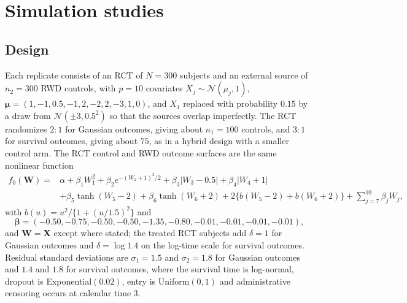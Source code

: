 \documentclass[11pt]{article}
\newcommand{\Normal}{\mathcal{N}}
\theoremstyle{definition}
\theoremstyle{plain}
\begin{document}

\section{Simulation studies}
\label{sec:sim}

\subsection{Design}
\label{sec:sim_design}

Each replicate consists of an RCT of $N=300$ subjects and an external source of $n_2=300$ RWD controls, with $p=10$ covariates $X_j\sim\Normal(\mu_j,1)$, $\bm\mu=(1,-1,0.5,-1,2,-2,2,-3,1,0)$, and $X_1$ replaced with probability $0.15$ by a draw from $\Normal(\pm3,0.5^2)$ so that the sources overlap imperfectly. The RCT randomizes $2{:}1$ for Gaussian outcomes, giving about $n_1=100$ controls, and $3{:}1$ for survival outcomes, giving about $75$, as in a hybrid design with a smaller control arm. The RCT control and RWD outcome surfaces are the same nonlinear function
\begin{equation}
\begin{aligned}
f_0(\bm W)={}&\alpha+\beta_1W_1^2+\beta_2e^{-(W_2+1)^2/2}+\beta_3|W_3-0.5|+\beta_4|W_4+1|\\
&+\beta_5\tanh(W_5-2)+\beta_6\tanh(W_6+2)+2\{b(W_5-2)+b(W_6+2)\}+\textstyle\sum_{j=7}^{10}\beta_jW_j,
\end{aligned}
\label{eq:dgp}
\end{equation}
with $b(u)=u^2/\{1+(u/1.5)^2\}$ and
\[
\bm\beta=(-0.50,-0.75,-0.50,-0.50,-1.35,-0.80,-0.01,-0.01,-0.01,-0.01),
\]
and $\bm W=\bm X$ except where stated; the treated RCT subjects add $\delta=1$ for Gaussian outcomes and $\delta=\log1.4$ on the log-time scale for survival outcomes. Residual standard deviations are $\sigma_1=1.5$ and $\sigma_2=1.8$ for Gaussian outcomes and $1.4$ and $1.8$ for survival outcomes, where the survival time is log-normal, dropout is Exponential$(0.02)$, entry is Uniform$(0,1)$ and administrative censoring occurs at calendar time $3$.
\end{document}
